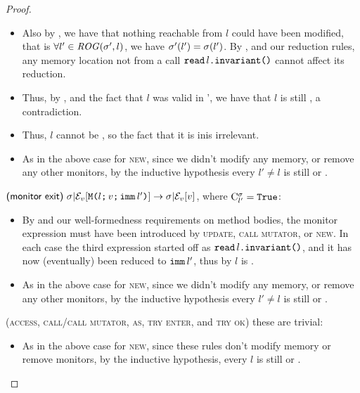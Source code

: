 \begin{proof}
\begin{ienumerate}
\begin{itemize}
		\item Also by , we have that nothing reachable from $l$ could have been modified, that is $\forall l' \in \mathit{ROG}(\sigma', l)$, we have $\sigma'(l') = \sigma(l')$.
			By , and our reduction rules, any memory location not \reach from a call $\texttt{read}\,l\texttt{.} \texttt{invariant}\texttt{(}\texttt{)}$ cannot affect its reduction.
		\item Thus, by , and the fact that $l$ was valid in \s', we have that $l$ is still \valid, a contradiction.
		\item Thus, $l$ cannot be \reach, so the fact that it is in\valid is irrelevant.
		
		\item As in the above case for \textsc{new}, since we didn't modify any memory, or remove any other monitors, by the inductive hypothesis every $l' \neq l$ is still \valid or \mony.
	\end{itemize}

		
	\item $\textsf{(monitor exit)}\ \sigma|\mathcal{E}_v{}[\texttt{M}\texttt{(}{}l\texttt{;}\,v\texttt{;}\,\texttt{imm}\,l'\texttt{)}] \rightarrow \sigma|\mathcal{E}_v{}[v]$, where $\mathrm{C}^{\sigma}_{l'} = \texttt{True}$:
	\begin{itemize}
		\item By \VS and our well-formedness requirements on method bodies, the monitor expression must have been introduced by \textsc{update}, \textsc{call mutator}, or \textsc{new}. In each case the third expression started off as $\texttt{read}\,l\texttt{.} \texttt{invariant}\texttt{(}\texttt{)}$, and it has now (eventually) been reduced to $\texttt{imm}\,l'$, thus by  $l$ is \valid.
		
		\item As in the above case for \textsc{new}, since we didn't modify any memory, or remove any other monitors, by the inductive hypothesis every \reach $l' \neq l$ is still \valid or \mony.
	\end{itemize}

	\item (\textsc{access}, \textsc{call/call mutator}, \textsc{as}, \textsc{try enter}, and \textsc{try ok}) these are trivial:
	\begin{itemize}
		\item As in the above case for \textsc{new}, since these rules don't modify memory or remove monitors, by the inductive hypothesis, every \reach $l$ is still \valid or \mony.
	\end{itemize}
\end{ienumerate}
\end{proof}

